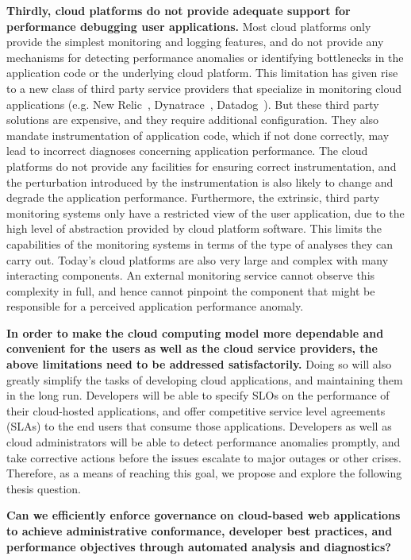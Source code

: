 \textbf{Thirdly, cloud platforms do not provide adequate support for performance debugging
user applications.} Most cloud platforms only provide the simplest monitoring and logging features,
and do not provide any mechanisms for detecting performance anomalies or identifying
bottlenecks in the application code or the underlying cloud platform. This limitation has given rise
to a new class of third party service providers that specialize in monitoring cloud applications
(e.g. New Relic~\cite{newrelic}, Dynatrace~\cite{dynatrace}, Datadog~\cite{datadog}). But these 
third party solutions are expensive, and they require additional configuration. 
They also mandate instrumentation of application code, which if not done
correctly, may lead to incorrect diagnoses concerning application performance. The cloud
platforms do not provide any facilities for ensuring correct instrumentation, and the perturbation
introduced by the instrumentation is also likely to change and degrade the application performance.
Furthermore, the extrinsic, third party monitoring systems only have a restricted view 
of the user application, due to the high level of abstraction provided by cloud platform software.
This limits the capabilities of the monitoring systems in terms of the type of analyses they can carry out.
Today's cloud platforms are also very large and complex with many interacting components.
An external monitoring service cannot observe this complexity in full, and hence cannot pinpoint
the component that might be responsible for a perceived application performance anomaly.

\textbf{In order to make the cloud computing model more dependable and convenient for the users as well
as the cloud service providers, the above limitations need to be addressed satisfactorily.}
Doing so will also greatly simplify the tasks of developing cloud applications, and maintaining 
them in the long run. Developers will be able to specify SLOs on the performance of
their cloud-hosted applications, and offer competitive service level agreements (SLAs) to the end users that consume those
applications. Developers as well as cloud administrators will be able to detect performance anomalies
promptly, and take corrective actions before the issues escalate to major
outages or other crises. Therefore, as a means of reaching this goal, we propose and explore the
following thesis question.

{\bf Can we efficiently enforce governance on cloud-based web applications to achieve 
administrative conformance, developer best practices, and performance objectives through 
automated analysis and diagnostics?} 

